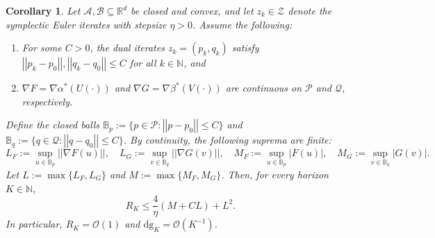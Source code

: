 \documentclass[11pt]{article}
\newtheorem{corollary}{Corollary}
\renewcommand{\P}{\mathcal{P}}
\newcommand{\N}{\mathbb{N}}
\newcommand{\Q}{\mathcal{Q}}
\newcommand{\lnorm}{\left|\left|}
\newcommand{\rnorm}{\right|\right|}
\begin{document}
\begin{corollary}\label{bounded}
Let $\mathcal{A},\mathcal{B}\subseteq\mathbb{R}^d$ be closed and convex, and let 
$z_k\in\mathcal{Z}$ denote the symplectic Euler iterates with stepsize $\eta>0$.
Assume the following:
\begin{enumerate}
\item For some $C>0$, the dual iterates $z_k=\left(p_k,q_k\right)$ satisfy $\lnorm p_k-p_0\rnorm,\lnorm q_k-q_0\rnorm\leq C$ for all $k\in\N$, and
\item $\nabla F=\nabla \alpha^{*}\left(U(\cdot)\right)$ and $\nabla G=\nabla \beta^{*}\left(V(\cdot)\right)$ are continuous on $\P$ and $\Q$, respectively.
\end{enumerate}
Define the closed balls $\mathbb{B}_p:=\{p\in\mathcal{P}:\lnorm p-p_0\rnorm\leq C\}$ and $\mathbb{B}_q:=\{q\in\mathcal{Q}:\lnorm q-q_0\rnorm\leq C\}$. By continuity, the following suprema are finite:
$$
L_F:=\sup_{u\in\mathbb B_p}{\lnorm\nabla F(u)\rnorm},\quad L_G:=\sup_{v\in\mathbb B_q}{\lnorm\nabla G(v)\rnorm},\quad M_F:=\sup_{u\in\mathbb B_p}{\left|F(u)\right|},\quad M_G:=\sup_{v\in\mathbb B_q}{\left|G(v)\right|}.
$$
Let $L:=\max\{L_F,L_G\}$ and $M:=\max\{M_F,M_G\}$. Then, for every horizon $K\in\mathbb{N}$,
$$
R_K\leq\frac{4}{\eta}\left(M+CL\right)+L^{2}.
$$
In particular, $R_K=\mathcal{O}(1)$ and $\overline{\mathrm{dg}}_K=\mathcal{O}(K^{-1})$.
\end{corollary}
\end{document}
